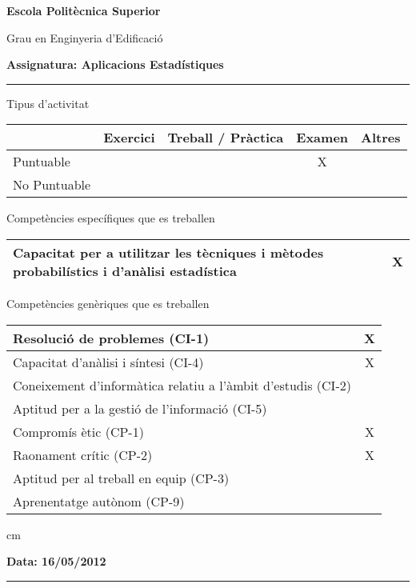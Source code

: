 \documentclass[a4paper,10pt]{article}
\begin{document}
\noindent
{\large \bf Escola Politècnica Superior}

\noindent
{\large Grau en Enginyeria d'Edificació}

\vskip 0.3cm
\noindent
{\large \bf Assignatura: Aplicacions Estadístiques}

\hrule

\vskip 0.3cm

\noindent
Tipus d'activitat

\begin{tabular}{|l|c|c|c|c|}
\hline
 & Exercici & Treball / Pràctica & Examen & Altres \\
\hline
Puntuable & & & X & \\ \hline
No Puntuable & & & & \\ \hline
\end{tabular}

\vskip 0.3cm

\noindent
Competències específiques que es treballen

\begin{tabular}{|l|c|}
\hline
Capacitat per a utilitzar les tècniques i mètodes probabilístics i d'anàlisi estadística & X \\
\hline
\end{tabular}

\vskip 0.3cm

\noindent
Competències genèriques que es treballen

\begin{tabular}{|l|c|}
\hline
Resolució de problemes (CI-1) & X \\ \hline
Capacitat d'anàlisi i síntesi (CI-4) & X \\ \hline
Coneixement d'informàtica relatiu a l'àmbit d'estudis (CI-2) & \\ \hline
Aptitud per a la gestió de l'informació (CI-5) & \\ \hline
Compromís ètic (CP-1) & X \\ \hline
Raonament crític (CP-2) & X \\ \hline
Aptitud per al treball en equip (CP-3) & \\ \hline
Aprenentatge autònom (CP-9) & \\ \hline
\end{tabular}


 cm

\noindent
\textbf{Data: 16/05/2012}

\hrule

\vspace{0.1 cm}
\end{document}
